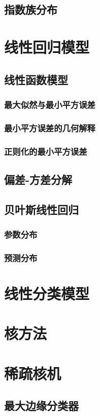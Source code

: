 \documentclass[11pt]{ctexbook}
\begin{document}
\section{指数族分布}

\chapter{线性回归模型}
\section{线性函数模型}
\subsection{最大似然与最小平方误差}
\subsection{最小平方误差的几何解释}
\subsection{正则化的最小平方误差}
\section{偏差-方差分解}
\section{贝叶斯线性回归}
\subsection{参数分布}
\subsection{预测分布}

\chapter{线性分类模型}

\chapter{核方法}

\chapter{稀疏核机}
\section{最大边缘分类器}
\end{document}
